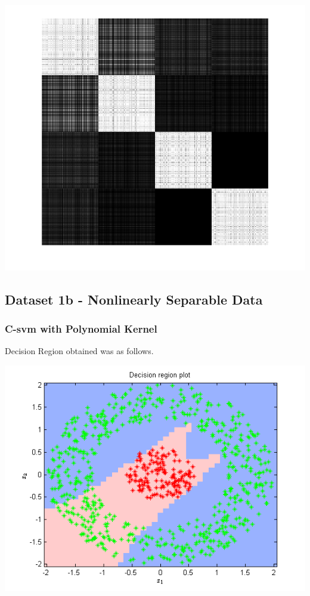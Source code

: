 \documentclass{article}
\begin{document}
\begin{center}
\includegraphics[scale=1]{Classification/1a/nu_g/kgm}
\end{center}







\subsection{Dataset 1b - Nonlinearly Separable Data}


\subsubsection{C-svm with Polynomial Kernel}

Decision Region obtained was as follows.
\begin{center}
\includegraphics[scale=1]{Classification/1b/c_poly/dec}
\end{center}
\end{document}
